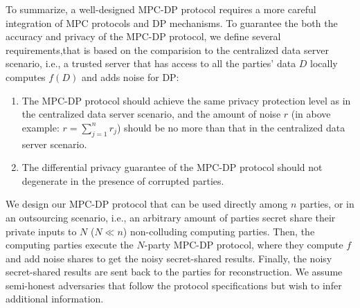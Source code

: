 To summarize, a well-designed MPC-DP protocol requires a more careful integration of MPC protocols and DP mechanisms. To guarantee the both the accuracy and privacy of the MPC-DP protocol, we define several requirements,that is based on the comparision to the centralized data server scenario, i.e., a trusted server that has access to all the parties' data $D$ locally computes $f\left( D\right) $ and adds noise for DP:

\begin{enumerate}
	\item The MPC-DP protocol should achieve the same privacy protection level as in the centralized data server scenario, and the amount of noise $r$ (in above example: $r=\sum_{j=1}^{n} r_j$) should be no more than that in the centralized data server scenario.
	\item The differential privacy guarantee of the MPC-DP protocol should not degenerate in the presence of corrupted parties.
\end{enumerate}

We design our MPC-DP protocol that can be used directly among $n$ parties, or in an outsourcing scenario, i.e., an arbitrary amount of parties secret share their private inputs to $N$ ($N\ll n$) non-colluding computing parties. Then, the computing parties execute the $N$-party MPC-DP protocol, where they compute $f$ and add noise shares to get the noisy secret-shared results. Finally, the noisy secret-shared results are sent back to the parties for reconstruction. We assume semi-honest adversaries that follow the protocol specifications but wish to infer additional information.




